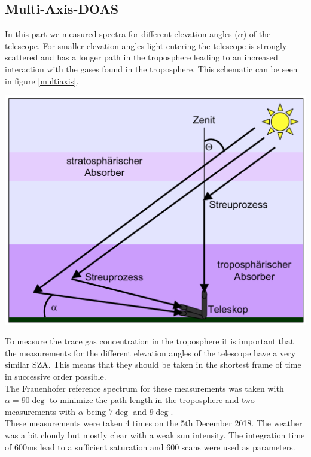 \documentclass[12pt, english]{scrartcl} %
\newenvironment{Figure}
  {\par\medskip\noindent\minipage{\linewidth}}
  {\endminipage\par\medskip}
\begin{document}
\begin{multicols}{2}
\subsection{Multi-Axis-DOAS}
In this part we measured spectra for different elevation angles ($\alpha$) of the telescope. For smaller elevation angles light entering the telescope is strongly scattered and has a longer path in the troposphere leading to an increased interaction with the gases found in the troposphere. This schematic can be seen in figure \ref{multiaxis}.
\begin{Figure}
 \centering
 \captionsetup{format=plain}
 \includegraphics[width=\linewidth]{graphics/multiaxis.png}
 \label{multiaxis}
\end{Figure}
To measure the trace gas concentration in the troposphere it is important that the measurements for the different elevation angles of the telescope have a very similar SZA. This means that they should be taken in the shortest frame of time in successive order possible.\\
The Frauenhofer reference spectrum for these measurements was taken with $\alpha = 90\deg$ to minimize the path length in the troposphere and two measurements with $\alpha$ being $7 \deg$ and $9 \deg$.\\
These measurements were taken 4 times on the 5th December 2018. The weather was a bit cloudy but mostly clear with a weak sun intensity.
The integration time of $600$ms lead to a sufficient saturation and 600 scans were used as parameters.

\end{multicols}
\end{document}
